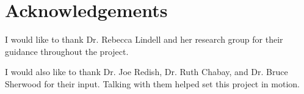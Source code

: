 \chapter[Acknowledgements]{Acknowledgements}

I would like to thank Dr. Rebecca Lindell and her research group for their guidance throughout the project.

I would also like to thank Dr. Joe Redish, Dr. Ruth Chabay, and Dr. Bruce Sherwood for their input. Talking with them helped set this project in motion.